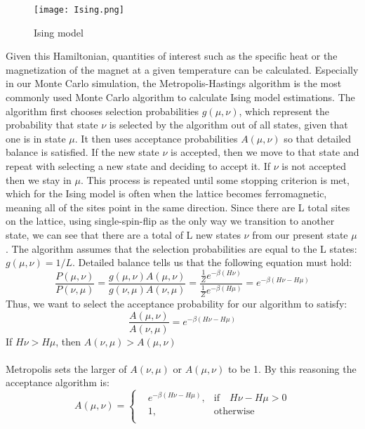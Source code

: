 \documentclass[prl,aps,twocolumn]{revtex4}
\begin{document}
    \begin{figure}[htb]
      \texttt{[image: Ising.png]}
      \caption{Ising model}
      \label{fig:1}
    \end{figure}
    \indent Given this Hamiltonian, quantities of interest such as the specific heat or the magnetization of the magnet at a given temperature can be calculated. Especially in our Monte Carlo simulation, the Metropolis-Hastings algorithm is the most commonly used Monte Carlo algorithm to calculate Ising model estimations. The algorithm first chooses selection probabilities $g(\mu,\nu)$, which represent the probability that state $\nu$ is selected by the algorithm out of all states, given that one is in state $\mu$. It then uses acceptance probabilities $A(\mu,\nu)$ so that detailed balance is satisfied. If the new state $\nu$ is accepted, then we move to that state and repeat with selecting a new state and deciding to accept it. If $\nu$ is not accepted then we stay in $\mu$. This process is repeated until some stopping criterion is met, which for the Ising model is often when the lattice becomes ferromagnetic, meaning all of the sites point in the same direction.
    \indent Since there are L total sites on the lattice, using single-spin-flip as the only way we transition to another state, we can see that there are a total of L new states $\nu$ from our present state $\mu$. The algorithm assumes that the selection probabilities are equal to the L states: $g(\mu,\nu) = 1/L$. Detailed balance tells us that the following equation must hold:
    \begin{equation}
      \frac{P(\mu,\nu)}{P(\nu,\mu)}=\frac{g(\mu,\nu)A(\mu,\nu)}{g(\nu,\mu)A(\nu,\mu)}=\frac{\frac{1}{Z}e^{-\beta(H\nu)}}{\frac{1}{Z}e^{-\beta(H\mu)}}=e^{-\beta(H\nu-H\mu)}
    \end{equation}
    Thus, we want to select the acceptance probability for our algorithm to satisfy:\\
    \begin{equation}
    \frac{A(\mu,\nu)}{A(\nu,\mu)}=e^{-\beta(H\nu-H\mu)}
    \end{equation}
    If $H\nu > H\mu$, then $A(\nu, \mu) > A(\mu, \nu)$ \\\\
    Metropolis sets the larger of $A(\nu, \mu)$ or $A(\mu, \nu)$ to be 1. By this reasoning the acceptance algorithm is:
    \begin{equation}
      A(\mu,\nu)=\left\{
                 \begin{aligned}
                      & e^{-\beta(H\nu-H\mu)}, & \text{if}\quad H\nu-H\mu >0 \\
                      & 1,                     & \text{otherwise} \\
                 \end{aligned}
                 \right.
    \end{equation}
\end{document}
